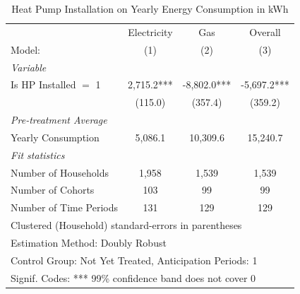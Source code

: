 \begin{table}[htbp]
   \caption{\label{tab:hp-did-cs} Heat Pump Installation on Yearly Energy Consumption in kWh}
   \centering
   \begin{tabular}{lccc}
      \tabularnewline \midrule \midrule
                                     & Electricity     & Gas     & Overall \\   
      Model:                         & (1)              & (2)              & (3)\\  
      \midrule
      \emph{Variable}\\
      Is HP Installed $=$ 1          & 2,715.2*** & -8,802.0*** & -5,697.2***\\   
                                     & (115.0)         & (357.4)         & (359.2)\\   
      \midrule
      \emph{Pre-treatment Average}\\
      Yearly Consumption              & 5,086.1 & 10,309.6 & 15,240.7\\   
      \midrule
      \emph{Fit statistics}\\
      Number of Households                   & 1,958           & 1,539           & 1,539\\  
      Number of Cohorts              & 103              & 99              & 99\\  
      Number of Time Periods         & 131             & 129             & 129\\  
      \midrule \midrule
      \multicolumn{4}{l}{Clustered (Household) standard-errors in parentheses}\\
      \multicolumn{4}{l}{Estimation Method: Doubly Robust}\\
      \multicolumn{4}{l}{Control Group: Not Yet Treated, Anticipation Periods: 1}\\
      \multicolumn{4}{l}{Signif. Codes: *** 99\% confidence band does not cover 0}\\
   \end{tabular}
\end{table}

